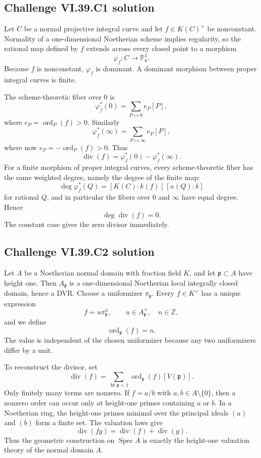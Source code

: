 
\subsection*{Challenge VI.39.C1 solution}
\begin{solution}
Let \(C\) be a normal projective integral curve and let \(f\in K(C)^\times\) be nonconstant.  Normality of a one-dimensional Noetherian scheme implies regularity, so the rational map defined by \(f\) extends across every closed point to a morphism
\[
 \varphi_f:C\longrightarrow\mathbb P^1_k.
\]
Because \(f\) is nonconstant, \(\varphi_f\) is dominant.  A dominant morphism between proper integral curves is finite.

The scheme-theoretic fiber over \(0\) is
\[
 \varphi_f^*(0)=\sum_{P\mapsto0} e_P[P],
\]
where \(e_P=\operatorname{ord}_P(f)>0\).  Similarly
\[
 \varphi_f^*(\infty)=\sum_{P\mapsto\infty} e_P[P],
\]
where now \(e_P=-\operatorname{ord}_P(f)>0\).  Thus
\[
 \operatorname{div}(f)=\varphi_f^*(0)-\varphi_f^*(\infty).
\]
For a finite morphism of proper integral curves, every scheme-theoretic fiber has the same weighted degree, namely the degree of the finite map:
\[
 \deg\varphi_f^*(Q)=[K(C):k(f)]\,[\kappa(Q):k]
\]
for rational \(Q\), and in particular the fibers over \(0\) and \(\infty\) have equal degree.  Hence
\[
 \deg\operatorname{div}(f)=0.
\]
The constant case gives the zero divisor immediately.
\end{solution}

\subsection*{Challenge VI.39.C2 solution}
\begin{solution}
Let \(A\) be a Noetherian normal domain with fraction field \(K\), and let \(\mathfrak p\subset A\) have height one.  Then \(A_{\mathfrak p}\) is a one-dimensional Noetherian local integrally closed domain, hence a DVR.  Choose a uniformizer \(\pi_{\mathfrak p}\).  Every \(f\in K^\times\) has a unique expression
\[
 f=u\pi_{\mathfrak p}^{n},\qquad
 u\in A_{\mathfrak p}^{\times},\quad n\in\mathbb Z,
\]
and we define
\[
 \operatorname{ord}_{\mathfrak p}(f)=n.
\]
The value is independent of the chosen uniformizer because any two uniformizers differ by a unit.

To reconstruct the divisor, set
\[
 \operatorname{div}(f)
 =\sum_{\operatorname{ht}\mathfrak p=1}
   \operatorname{ord}_{\mathfrak p}(f)[V(\mathfrak p)].
\]
Only finitely many terms are nonzero.  If \(f=a/b\) with \(a,b\in A\setminus\{0\}\), then a nonzero order can occur only at height-one primes containing \(a\) or \(b\).  In a Noetherian ring, the height-one primes minimal over the principal ideals \((a)\) and \((b)\) form a finite set.  The valuation laws give
\[
 \operatorname{div}(fg)=\operatorname{div}(f)+\operatorname{div}(g).
\]
Thus the geometric construction on \(\operatorname{Spec}A\) is exactly the height-one valuation theory of the normal domain \(A\).
\end{solution}


